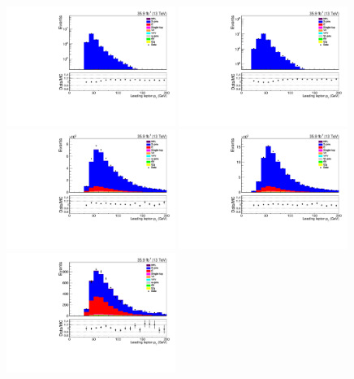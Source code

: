 \begin{figure}[ht]
\centering
\includegraphics[width=0.49\textwidth]{figs/background-estimation/plots/unblinded/prompt_ee_ttbarInc/lep1Pt_NPL_ee_lepSel_ee_log.pdf}
\includegraphics[width=0.49\textwidth]{figs/background-estimation/plots/unblinded/prompt_mumu_ttbarInc/lep1Pt_NPL_mumu_lepSel_mumu_log.pdf}
\\
\includegraphics[width=0.49\textwidth]{figs/background-estimation/plots/unblinded/prompt_ee_ttbarInc/lep1Pt_NPL_ee_jetSel_ee.pdf}
\includegraphics[width=0.49\textwidth]{figs/background-estimation/plots/unblinded/prompt_mumu_ttbarInc/lep1Pt_NPL_mumu_jetSel_mumu.pdf}
\\
\includegraphics[width=0.49\textwidth]{figs/background-estimation/plots/unblinded/prompt_ee_ttbarInc/lep1Pt_NPL_ee_wMass_ee.pdf}

\end{figure}
